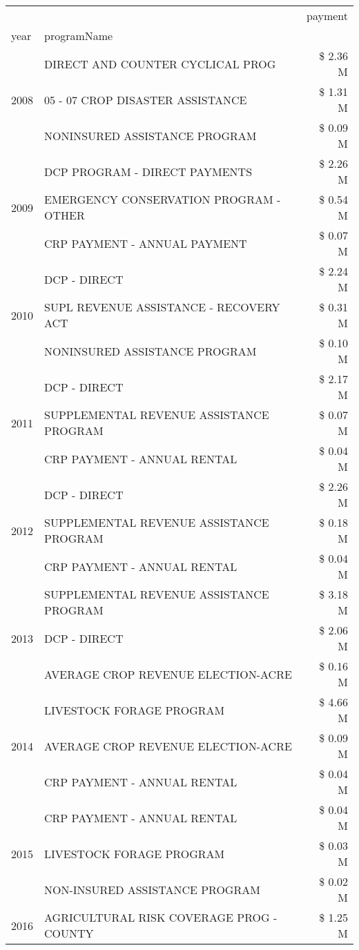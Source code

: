 \begin{tabular}{llr}
\toprule
 &  & payment \\
year & programName &  \\
\midrule
\multirow[t]{3}{*}{2008} & DIRECT AND COUNTER CYCLICAL PROG & \$ 2.36 M \\
 & 05 - 07 CROP DISASTER ASSISTANCE & \$ 1.31 M \\
 & NONINSURED ASSISTANCE PROGRAM & \$ 0.09 M \\
\cline{1-3}
\multirow[t]{3}{*}{2009} & DCP PROGRAM - DIRECT PAYMENTS & \$ 2.26 M \\
 & EMERGENCY CONSERVATION PROGRAM - OTHER & \$ 0.54 M \\
 & CRP PAYMENT - ANNUAL PAYMENT & \$ 0.07 M \\
\cline{1-3}
\multirow[t]{3}{*}{2010} & DCP - DIRECT & \$ 2.24 M \\
 & SUPL REVENUE ASSISTANCE - RECOVERY ACT & \$ 0.31 M \\
 & NONINSURED ASSISTANCE PROGRAM & \$ 0.10 M \\
\cline{1-3}
\multirow[t]{3}{*}{2011} & DCP - DIRECT & \$ 2.17 M \\
 & SUPPLEMENTAL REVENUE ASSISTANCE PROGRAM & \$ 0.07 M \\
 & CRP PAYMENT - ANNUAL RENTAL & \$ 0.04 M \\
\cline{1-3}
\multirow[t]{3}{*}{2012} & DCP - DIRECT & \$ 2.26 M \\
 & SUPPLEMENTAL REVENUE ASSISTANCE PROGRAM & \$ 0.18 M \\
 & CRP PAYMENT - ANNUAL RENTAL & \$ 0.04 M \\
\cline{1-3}
\multirow[t]{3}{*}{2013} & SUPPLEMENTAL REVENUE ASSISTANCE PROGRAM & \$ 3.18 M \\
 & DCP - DIRECT & \$ 2.06 M \\
 & AVERAGE CROP REVENUE ELECTION-ACRE & \$ 0.16 M \\
\cline{1-3}
\multirow[t]{3}{*}{2014} & LIVESTOCK FORAGE PROGRAM & \$ 4.66 M \\
 & AVERAGE CROP REVENUE ELECTION-ACRE & \$ 0.09 M \\
 & CRP PAYMENT - ANNUAL RENTAL & \$ 0.04 M \\
\cline{1-3}
\multirow[t]{3}{*}{2015} & CRP PAYMENT - ANNUAL RENTAL & \$ 0.04 M \\
 & LIVESTOCK FORAGE PROGRAM & \$ 0.03 M \\
 & NON-INSURED ASSISTANCE PROGRAM & \$ 0.02 M \\
\cline{1-3}
\multirow[t]{3}{*}{2016} & AGRICULTURAL RISK COVERAGE PROG - COUNTY & \$ 1.25 M \\

\end{tabular}
